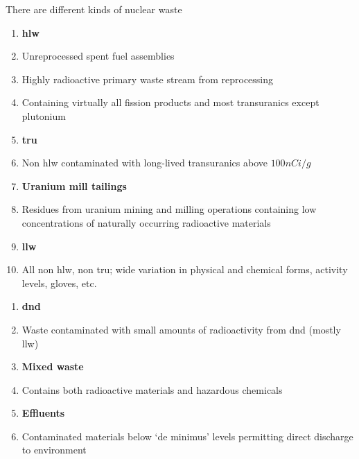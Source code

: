 \documentclass[aspectratio=1610,pdftex,dvipsnames,compress,xcolor={dvipsnames}]{beamer}
\newcommand{\acf}{\acrfull} %
\newcommand{\acs}{\acrshort} %
\begin{document}
\begin{frame}{There are different kinds of nuclear waste}
    \begin{enumerate}[series=outerlist,topsep=0pt,itemsep=3pt,leftmargin=*,label=(\arabic*)]
        \item[]\textbf{\acf{hlw}}
        \item[]Unreprocessed spent fuel assemblies
        \item[]Highly radioactive primary waste stream from reprocessing
        \item[]Containing virtually all fission products and most transuranics except plutonium
            \vspace{0.05in}
        \item[]\textbf{\acf{tru}}
        \item[]Non \acs{hlw} contaminated with long-lived transuranics above $100 nCi/g$
            \vspace{0.05in}
        \item[]\textbf{Uranium mill tailings}
        \item[]Residues from uranium mining and milling operations containing low concentrations of naturally occurring radioactive materials
            \vspace{0.05in}
        \item[]\textbf{\acf{llw}}
        \item[]All non \acs{hlw}, non \acs{tru}; wide variation in physical and chemical forms, activity levels, gloves, etc.
    \end{enumerate}
\end{frame}


\begin{frame}[t]
    \begin{enumerate}[series=outerlist,topsep=0pt,itemsep=3pt,leftmargin=*,label=(\arabic*)]
        \item[]\textbf{\acf{dnd}}
        \item[]Waste contaminated with small amounts of radioactivity from \acs{dnd} (mostly \acs{llw})
            \vspace{0.05in}
        \item[]\textbf{Mixed waste}
        \item[]Contains both radioactive materials and hazardous chemicals
            \vspace{0.05in}
        \item[]\textbf{Effluents}
        \item[]Contaminated materials below `de minimus’ levels permitting direct discharge to environment
    \end{enumerate}
\end{frame}
\end{document}
